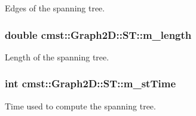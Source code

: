 Edges of the spanning tree. 

\subsubsection[{\texorpdfstring{m\_length}{m_length}}]{\setlength{\rightskip}{0pt plus 5cm}double cmst::Graph2D::ST::m\_length}\hypertarget{structcmst_1_1_graph2_d_1_1_s_t_a954af452de884ab5a96ef6a396b9d531}{}\label{structcmst_1_1_graph2_d_1_1_s_t_a954af452de884ab5a96ef6a396b9d531}


Length of the spanning tree. 

\subsubsection[{\texorpdfstring{m\_stTime}{m_stTime}}]{\setlength{\rightskip}{0pt plus 5cm}int cmst::Graph2D::ST::m\_stTime}\hypertarget{structcmst_1_1_graph2_d_1_1_s_t_ad3201db988690542cc7ef7ddff9525cc}{}\label{structcmst_1_1_graph2_d_1_1_s_t_ad3201db988690542cc7ef7ddff9525cc}


Time used to compute the spanning tree. 

